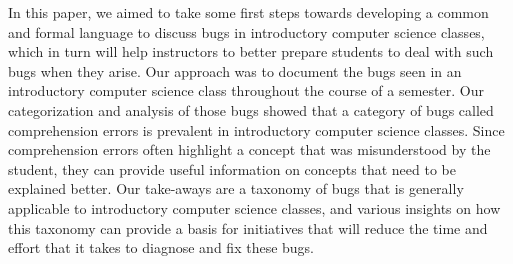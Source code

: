 \documentclass{sig-alternate}
\begin{document}
In this paper, we aimed to take some first steps towards developing a common and formal language to discuss bugs in introductory computer science classes, which in turn will help instructors to better prepare students to deal with such bugs when they arise. Our approach was to document the bugs seen in an introductory computer science class throughout the course of a semester. Our categorization and analysis of those bugs showed that a category of bugs called comprehension errors is prevalent in introductory computer science classes. Since comprehension errors often highlight a concept that was misunderstood by the student, they can provide useful information on concepts that need to be explained better. Our take-aways are a taxonomy of bugs that is generally applicable to introductory computer science classes, and various insights on how this taxonomy can provide a basis for initiatives that will reduce the time and effort that it takes to diagnose and fix these bugs.



\balancecolumns
\end{document}
